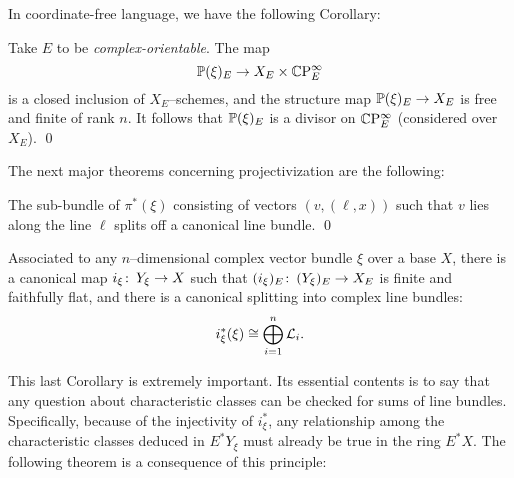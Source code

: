 In coordinate-free language, we have the following Corollary:
\begin{corollary}
Take $E$ to be \emph{complex-orientable}.  The map \[\P(\xi)_E \to X_E \times \CP^\infty_E\] is a closed inclusion of $X_E$--schemes, and the structure map $\P(\xi)_E \to X_E$ is free and finite of rank $n$.  It follows that $\P(\xi)_E$ is a divisor on $\CP^\infty_E$ (considered over $X_E$). \qed {}
\end{corollary}

The next major theorems concerning projectivization are the following:

\begin{corollary}
The sub-bundle of $\pi^*(\xi)$ consisting of vectors $(v, (\ell, x))$ such that $v$ lies along the line $\ell$ splits off a canonical line bundle. \qed
\end{corollary}

\begin{corollary}\label{OriginalSplittingPrinciple}
Associated to any $n$--dimensional complex vector bundle $\xi$ over a base $X$, there is a canonical map $i_\xi\co Y_\xi \to X$ such that $(i_\xi)_E\co (Y_\xi)_E \to X_E$ is finite and faithfully flat, and there is a canonical splitting into complex line bundles: \[i_\xi^*(\xi) \cong \bigoplus_{i=1}^n \L_i. \qed\]
\end{corollary}

This last Corollary is extremely important.  Its essential contents is to say that any question about characteristic classes can be checked for sums of line bundles.  Specifically, because of the injectivity of $i_\xi^*$, any relationship among the characteristic classes deduced in $E^* Y_\xi$ must already be true in the ring $E^* X$.  The following theorem is a consequence of this principle:

